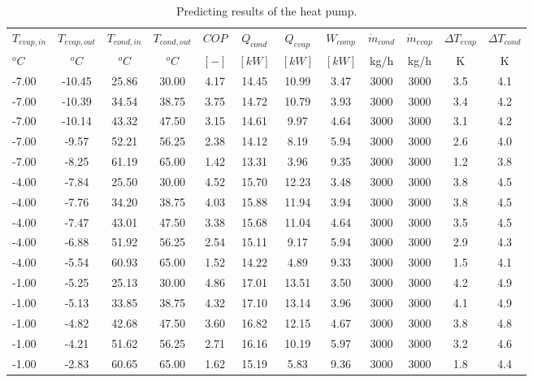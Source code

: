 \documentclass[english]{SPFShortReport}
\begin{document}
\begin{table}[!ht]
\begin{small}
\caption{Predicting results of the heat pump.}
\begin{center}
\resizebox{12cm}{!} 
{
\begin{tabular}{l | c c c c c c c c c c c } 
\hline
\hline
$T_{evap,in}$ &$T_{evap,out}$ &$T_{cond,in}$ &$T_{cond,out}$ &$COP$ &$Q_{cond}$ &$Q_{evap}$ &$W_{comp}$ &$\dot m_{cond}$ &$\dot m_{evap}$ &$\Delta T_{evap}$ &$\Delta T_{cond}$ \\ 
$^oC$ &$^oC$ &$^oC$ &$^oC$ &$[-]$ &$[kW]$ &$[kW]$ &$[kW]$ &kg/h &kg/h &K &K\\ 
\hline
-7.00 & -10.45 & 25.86 & 30.00 & 4.17 & 14.45 & 10.99 & 3.47 & 3000 & 3000 & 3.5 & 4.1\\ 
-7.00 & -10.39 & 34.54 & 38.75 & 3.75 & 14.72 & 10.79 & 3.93 & 3000 & 3000 & 3.4 & 4.2\\ 
-7.00 & -10.14 & 43.32 & 47.50 & 3.15 & 14.61 & 9.97 & 4.64 & 3000 & 3000 & 3.1 & 4.2\\ 
-7.00 & -9.57 & 52.21 & 56.25 & 2.38 & 14.12 & 8.19 & 5.94 & 3000 & 3000 & 2.6 & 4.0\\ 
-7.00 & -8.25 & 61.19 & 65.00 & 1.42 & 13.31 & 3.96 & 9.35 & 3000 & 3000 & 1.2 & 3.8\\ 
-4.00 & -7.84 & 25.50 & 30.00 & 4.52 & 15.70 & 12.23 & 3.48 & 3000 & 3000 & 3.8 & 4.5\\ 
-4.00 & -7.76 & 34.20 & 38.75 & 4.03 & 15.88 & 11.94 & 3.94 & 3000 & 3000 & 3.8 & 4.5\\ 
-4.00 & -7.47 & 43.01 & 47.50 & 3.38 & 15.68 & 11.04 & 4.64 & 3000 & 3000 & 3.5 & 4.5\\ 
-4.00 & -6.88 & 51.92 & 56.25 & 2.54 & 15.11 & 9.17 & 5.94 & 3000 & 3000 & 2.9 & 4.3\\ 
-4.00 & -5.54 & 60.93 & 65.00 & 1.52 & 14.22 & 4.89 & 9.33 & 3000 & 3000 & 1.5 & 4.1\\ 
-1.00 & -5.25 & 25.13 & 30.00 & 4.86 & 17.01 & 13.51 & 3.50 & 3000 & 3000 & 4.2 & 4.9\\ 
-1.00 & -5.13 & 33.85 & 38.75 & 4.32 & 17.10 & 13.14 & 3.96 & 3000 & 3000 & 4.1 & 4.9\\ 
-1.00 & -4.82 & 42.68 & 47.50 & 3.60 & 16.82 & 12.15 & 4.67 & 3000 & 3000 & 3.8 & 4.8\\ 
-1.00 & -4.21 & 51.62 & 56.25 & 2.71 & 16.16 & 10.19 & 5.97 & 3000 & 3000 & 3.2 & 4.6\\ 
-1.00 & -2.83 & 60.65 & 65.00 & 1.62 & 15.19 & 5.83 & 9.36 & 3000 & 3000 & 1.8 & 4.4\\ 

\end{tabular}}
\end{center}
\end{small}
\end{table}
\end{document}
